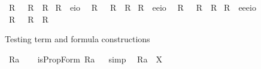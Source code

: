 \begin{isabellebody}
\ R{}\ \ \ {\isachardoublequoteopen}R{}\ {\isasymequiv}\ {\isachardot}R{\isacharunderscore}{}{\isachardot}{\isachardoublequoteclose}\isanewline
{}\isamarkupfalse%
\ R{\isacharunderscore}{}\ {\isacharcolon}{\isacharcolon}\ {\isachardoublequoteopen}e{\isasymRightarrow}io{\isachardoublequoteclose}\ \isamarkupfalse%
\ R{}\ \ \ {\isachardoublequoteopen}R{}\ {\isasymequiv}\ {\isachardot}R{\isacharunderscore}{}{\isachardot}{\isachardoublequoteclose}\isanewline
{}\isamarkupfalse%
\ R{\isacharunderscore}{}\ {\isacharcolon}{\isacharcolon}\ {\isachardoublequoteopen}e{\isasymRightarrow}e{\isasymRightarrow}io{\isachardoublequoteclose}\ \isamarkupfalse%
\ R{}\ \ \ {\isachardoublequoteopen}R{}\ {\isasymequiv}\ {\isachardot}R{\isacharunderscore}{}{\isachardot}{\isachardoublequoteclose}\isanewline
{}\isamarkupfalse%
\ R{\isacharunderscore}{}\ {\isacharcolon}{\isacharcolon}\ {\isachardoublequoteopen}e{\isasymRightarrow}e{\isasymRightarrow}e{\isasymRightarrow}io{\isachardoublequoteclose}\ \ \isamarkupfalse%
\ R{}\ \ \ {\isachardoublequoteopen}R{}\ {\isasymequiv}\ {\isachardot}R{\isacharunderscore}{}{\isachardot}{\isachardoublequoteclose}%
\begin{isamarkuptext}%
Testing term and formula constructions%
\end{isamarkuptext}%
\isamarkuptrue%
\isamarkupfalse%
\ {\isachardoublequoteopen}{\isacharbrackleft}{\isacharless}R{}{\isasymbullet}a{\isachargreater}{\isacharbrackright}{\isachardoublequoteclose}\ \isamarkupfalse%
%
\isadelimproof
\ %
\endisadelimproof
%
\isatagproof
{}\isamarkupfalse%
%
\endisatagproof
{\isafoldproof}%
%
\isadelimproof
%
\endisadelimproof
\isanewline
{}\isamarkupfalse%
\ {\isachardoublequoteopen}isPropForm\ {\isacharless}R{}{\isasymbullet}a{\isachargreater}{\isachardoublequoteclose}%
\isadelimproof
\ %
\endisadelimproof
%
\isatagproof
{}\isamarkupfalse%
\ {\isacharparenleft}simp{\isacharparenright}\ \isamarkupfalse%
%
\endisatagproof
{\isafoldproof}%
%
\isadelimproof
%
\endisadelimproof
\isanewline
{}\isamarkupfalse%
\ {\isachardoublequoteopen}{\isacharless}R{}{\isasymbullet}a{\isachargreater}\ {\isacharequal}\ X{\isachardoublequoteclose}%

\end{isabellebody}
